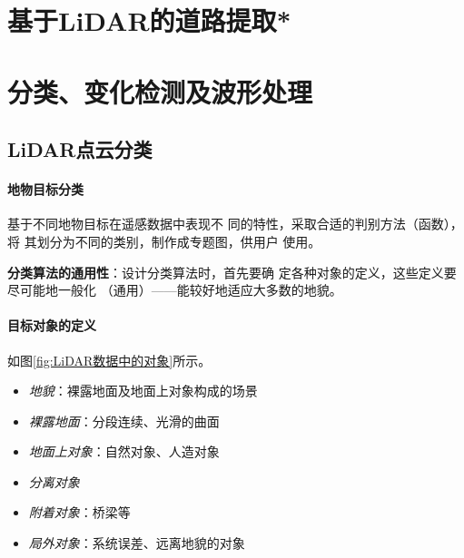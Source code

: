 \section{基于LiDAR的道路提取*}

\section{分类、变化检测及波形处理}

\subsection{LiDAR点云分类}

\paragraph{地物目标分类}基于不同地物目标在遥感数据中表现不
同的特性，采取合适的判别方法（函数），将
其划分为不同的类别，制作成专题图，供用户
使用。

\textbf{分类算法的通用性}：设计分类算法时，首先要确
定各种对象的定义，这些定义要尽可能地一般化
（通用）——能较好地适应大多数的地貌。

\paragraph{目标对象的定义}如图\ref{fig:LiDAR数据中的对象}所示。
\begin{itemize}
	\item \textit{地貌}：裸露地面及地面上对象构成的场景
	\item \textit{裸露地面}：分段连续、光滑的曲面
	\item \textit{地面上对象}：自然对象、人造对象
	\item \textit{分离对象}
	\item \textit{附着对象}：桥梁等
	\item \textit{局外对象}：系统误差、远离地貌的对象
\end{itemize}

